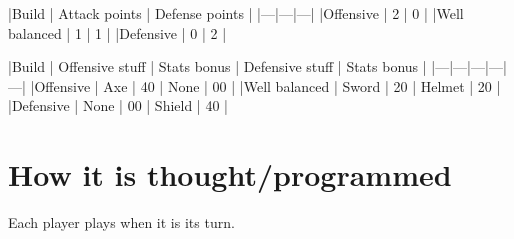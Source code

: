 |Build | Attack points | Defense points |
|---|---|---|
|Offensive | 2 | 0 |
|Well balanced | 1 | 1 |
|Defensive | 0 | 2 |

|Build | Offensive stuff | Stats bonus | Defensive stuff | Stats bonus |
|---|---|---|---|---|
|Offensive | Axe | 40 | None | 00 |
|Well balanced | Sword | 20 | Helmet | 20 |
|Defensive | None | 00 | Shield | 40 |

\section{How it is thought/programmed}

Each player plays when it is its turn.



